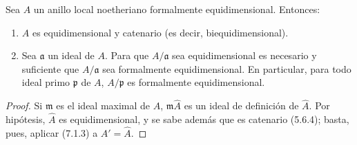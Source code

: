 \begin{corollary}[7.1.4]
\label{IV.2.s7.1.4-fr}
Sea $A$ un anillo local noetheriano formalmente
equidimensional. Entonces:
\begin{enumerate}
\item[\textup{(i)}] $A$ es equidimensional y catenario
\textup{(es decir,} biequidimensional\textup{)}.
\item[\textup{(ii)}] Sea $\mathfrak a$ un ideal de $A$.
Para que $A/\mathfrak a$ sea equidimensional es
necesario y suficiente que $A/\mathfrak a$ sea
formalmente equidimensional. En particular, para
todo ideal primo $\mathfrak p$ de $A$,
$A/\mathfrak p$ es formalmente equidimensional.
\end{enumerate}
\end{corollary}

\begin{proof}
Si $\mathfrak m$ es el ideal maximal de $A$,
$\mathfrak m\widehat A$ es un ideal de definición
de $\widehat A$. Por hipótesis, $\widehat A$ es
equidimensional, y se sabe además que es catenario
(5.6.4); basta, pues, aplicar (7.1.3) a
$A'=\widehat A$.
\end{proof}
